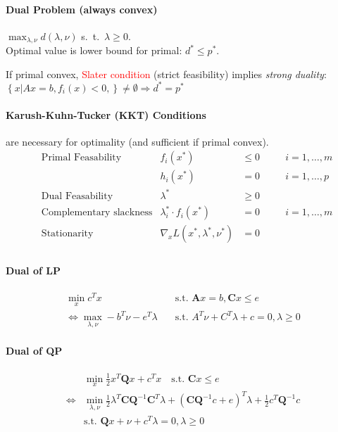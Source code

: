 \documentclass[landscape,a4paper,8pt]{scrartcl}
\renewcommand{\iff}{\Leftrightarrow}
\newcommand{\remph}[1]{{\textcolor{red}{#1}}}
\newcommand\vA{\bm{A}}
\newcommand\vC{\bm{C}}
\newcommand\vQ{\bm{Q}}
\begin{document}
\begin{multicols*}{3}
\paragraph{Dual Problem (always convex)} 
$\max_{\lambda,\nu} d(\lambda,\nu)$ s.\ t.\ $\lambda \geq 0$. \\
Optimal value is lower bound for primal: $d^* \leq p^*$.

If primal convex, \remph{Slater condition} (strict feasibility) implies \emph{strong duality}:
$\left\{x \left| \right. Ax=b, f_i(x)<0, \right\} \neq \emptyset \Rightarrow d^*  = p^* $
%
\paragraph{Karush-Kuhn-Tucker (KKT) Conditions}
are necessary for optimality (and sufficient if primal convex).
\begin{align*}
& \text{Primal Feasability} & f_i(x^*)  &\leq 0 \quad && i=1,\dots,m \\
&                           & h_i(x^*)  &=0 \quad && i=1,\dots,p \\
& \text{Dual Feasability}        & \lambda^* & \geq 0 && \\
& \text{Complementary slackness} & \lambda_i^* \cdot f_i(x^*) & = 0 && i = 1,\dots,m \\
& \text{Stationarity} & \nabla_x L(x^*,\lambda^*,\nu^*) & = 0 && \\
\end{align*}
%
\paragraph{Dual of LP}
\begin{align*}
     \min_x c^T x & \quad \text{s.t.\ } \vA x = b, \vC x \leq e \\
\iff \max_{\lambda,\nu} -b^T\nu - e^T\lambda & \quad \text{s.t.\ } A^T\nu + C^T\lambda + c = 0, \lambda \geq 0
\end{align*}

\paragraph{Dual of QP}
\begin{align*}
     & \min_x \frac{1}{2}x^T\vQ x + c^T x \quad \text{s.t.\ } \vC x \leq e \\
\iff & \min_{\lambda,\nu} \frac{1}{2}\lambda^T\vC\vQ^{-1}\vC^T\lambda + (\vC\vQ^{-1}c + e)^T\lambda + \frac{1}{2} c^T \vQ^{-1}c \\
     & \text{s.t.\ } \vQ x + \nu + c^T \lambda = 0, \lambda \geq 0
\end{align*}


\end{multicols*}
\end{document}
